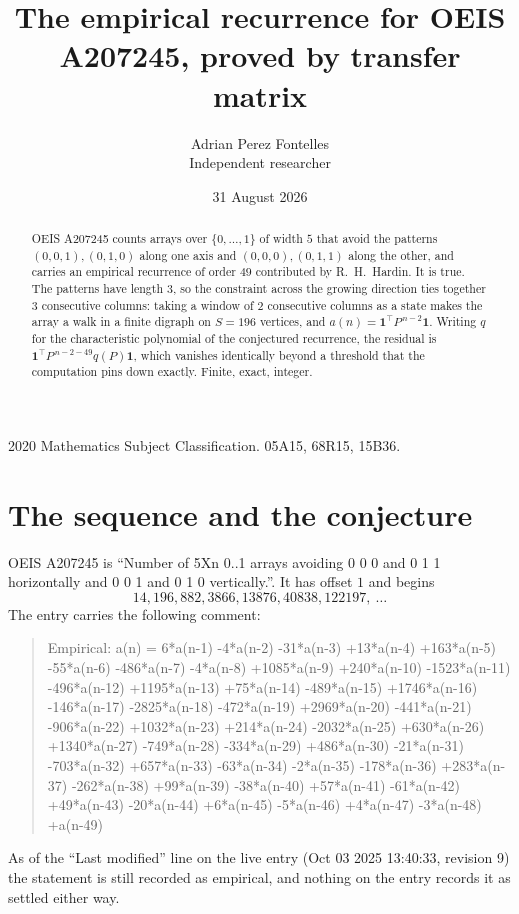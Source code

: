 \documentclass[11pt,a4paper]{article}
\title{The empirical recurrence for OEIS A207245, proved by transfer matrix}
\author{Adrian Perez Fontelles\\ \small Independent researcher}
\date{31 August 2026}
\theoremstyle{plain}
\theoremstyle{definition}
\begin{document}
\maketitle

\begin{abstract}
OEIS A207245 counts arrays over $\{0,\dots,1\}$ of width $5$ that avoid the patterns
$(0,0,1), (0,1,0)$ along one axis and $(0,0,0), (0,1,1)$ along the other, and carries an empirical recurrence of
order $49$ contributed by R.~H.~Hardin. It is true. The patterns have length $3$, so
the constraint across the growing direction ties together $3$ consecutive columns: taking a
window of $2$ consecutive columns as a state makes the array a walk in a finite digraph
on $S=196$ vertices, and $a(n)=\mathbf{1}^{\!\top}P^{\,n-2}\mathbf{1}$. Writing $q$
for the characteristic polynomial of the conjectured recurrence, the residual is
$\mathbf{1}^{\!\top}P^{\,n-2-49}q(P)\mathbf{1}$, which vanishes identically
beyond a threshold that the computation pins down exactly. Finite, exact, integer.
\end{abstract}

\noindent\small 2020 Mathematics Subject Classification. 05A15, 68R15, 15B36.\normalsize

\section{The sequence and the conjecture}

OEIS A207245 is ``Number of 5Xn 0..1 arrays avoiding 0 0 0 and 0 1 1 horizontally and 0 0 1 and 0 1 0 vertically.''. It has offset
$1$ and begins
\[
14, 196, 882, 3866, 13876, 40838, 122197,\ \dots
\]
The entry carries the following comment:
\begin{quote}\small
Empirical: a(n) = 6*a(n-1) -4*a(n-2) -31*a(n-3) +13*a(n-4) +163*a(n-5) -55*a(n-6) -486*a(n-7) -4*a(n-8) +1085*a(n-9) +240*a(n-10) -1523*a(n-11) -496*a(n-12) +1195*a(n-13) +75*a(n-14) -489*a(n-15) +1746*a(n-16) -146*a(n-17) -2825*a(n-18) -472*a(n-19) +2969*a(n-20) -441*a(n-21) -906*a(n-22) +1032*a(n-23) +214*a(n-24) -2032*a(n-25) +630*a(n-26) +1340*a(n-27) -749*a(n-28) -334*a(n-29) +486*a(n-30) -21*a(n-31) -703*a(n-32) +657*a(n-33) -63*a(n-34) -2*a(n-35) -178*a(n-36) +283*a(n-37) -262*a(n-38) +99*a(n-39) -38*a(n-40) +57*a(n-41) -61*a(n-42) +49*a(n-43) -20*a(n-44) +6*a(n-45) -5*a(n-46) +4*a(n-47) -3*a(n-48) +a(n-49)
\end{quote}
As of the ``Last modified'' line on the live entry (Oct 03 2025 13:40:33, revision
9) the statement is still recorded as empirical, and nothing on the entry
records it as settled either way.
\end{document}
